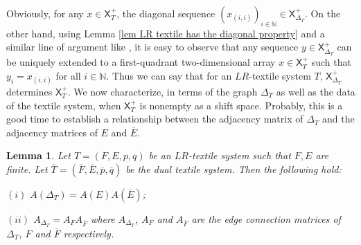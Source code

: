 \documentclass[a4paper,reqno,12pt]{amsart}
\newtheorem{lem}[thm]{Lemma}
\theoremstyle{definition}
\theoremstyle{remark}
\begin{document}
Obviously, for any $x\in \mathsf{X}_T^+$, the diagonal sequence $(x_{(i,i)})_{i\in \mathbb{N}}\in \mathsf{X}_{\Delta_T}^+$. On the other hand, using Lemma \ref{lem LR textile has the diagonal property} and a similar line of argument like \cite[Lemma 3.2]{Matsumoto}, it is easy to observe that any sequence $y\in \mathsf{X}_{\Delta_T}^+$ can be uniquely extended to a first-quadrant two-dimensional array $x\in \mathsf{X}_T^+$ such that $y_i=x_{(i,i)}$ for all $i\in \mathbb{N}$. Thus we can say that for an $LR$-textile system $T$, $\mathsf{X}_{\Delta_T}^+$ determines $\mathsf{X}_T^+$. We now characterize, in terms of the graph $\Delta_T$ as well as the data of the textile system, when $\mathsf{X}_T^+$ is nonempty as a shift space. Probably, this is a good time to establish a relationship between the adjacency matrix of $\Delta_T$ and the adjacency matrices of $E$ and $\overline{E}$. 
\begin{lem}\label{lem conncetion between matrices}
Let $T=(F,E,p,q)$ be an $LR$-textile system such that $F,E$ are finite. Let $\overline{T}=(\overline{F},\overline{E},\overline{p},\overline{q})$ be the dual textile system. Then the following hold:

$(i)$ $A(\Delta_T)=A(E)A(\overline{E})$;

$(ii)$ $A_{\Delta_T}=A_F A_{\overline{F}}$ where $A_{\Delta_T}$, $A_F$ and $A_{\overline{F}}$ are the edge connection matrices of $\Delta_T$, $F$ and $\overline{F}$ respectively.  
\end{lem}
\end{document}
